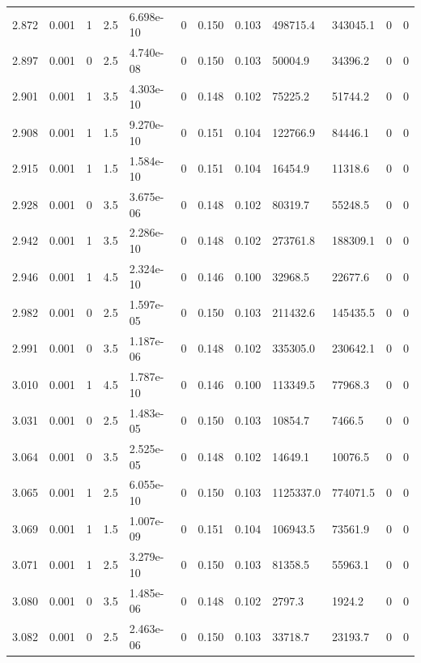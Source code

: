 \documentclass[preview]{standalone}
\begin{document}
{{{{{{{\begin{tabular}{L{1.2cm}C{1.2cm} C{0.3cm}C{0.5cm} C{1.4cm}C{1.4cm} C{1.4cm}C{1.4cm} C{1.6cm}C{1.6cm} C{1.6cm}C{1.6cm}}
  2.872  &  0.001  & 1     & 2.5 &  6.698e-10  & 0  &  0.150&   0.103& 498715.4 & 343045.1   &  0 & 0  \\ 
  2.897  &  0.001  & 0     & 2.5 &  4.740e-08  & 0  &  0.150&   0.103& 50004.9 & 34396.2   &  0 & 0  \\ 
  2.901  &  0.001  & 1     & 3.5 &  4.303e-10  & 0  &  0.148&   0.102& 75225.2 & 51744.2   &  0 & 0  \\ 
  2.908  &  0.001  & 1     & 1.5 &  9.270e-10  & 0  &  0.151&   0.104& 122766.9 & 84446.1   &  0 & 0  \\ 
  2.915  &  0.001  & 1     & 1.5 &  1.584e-10  & 0  &  0.151&   0.104& 16454.9 & 11318.6   &  0 & 0  \\ 
  2.928  &  0.001  & 0     & 3.5 &  3.675e-06  & 0  &  0.148&   0.102& 80319.7 & 55248.5   &  0 & 0  \\ 
  2.942  &  0.001  & 1     & 3.5 &  2.286e-10  & 0  &  0.148&   0.102& 273761.8 & 188309.1   &  0 & 0  \\ 
  2.946  &  0.001  & 1     & 4.5 &  2.324e-10  & 0  &  0.146&   0.100& 32968.5 & 22677.6   &  0 & 0  \\ 
  2.982  &  0.001  & 0     & 2.5 &  1.597e-05  & 0  &  0.150&   0.103& 211432.6 & 145435.5   &  0 & 0  \\ 
  2.991  &  0.001  & 0     & 3.5 &  1.187e-06  & 0  &  0.148&   0.102& 335305.0 & 230642.1   &  0 & 0  \\ 
  3.010  &  0.001  & 1     & 4.5 &  1.787e-10  & 0  &  0.146&   0.100& 113349.5 & 77968.3   &  0 & 0  \\ 
  3.031  &  0.001  & 0     & 2.5 &  1.483e-05  & 0  &  0.150&   0.103& 10854.7 & 7466.5   &  0 & 0  \\ 
  3.064  &  0.001  & 0     & 3.5 &  2.525e-05  & 0  &  0.148&   0.102& 14649.1 & 10076.5   &  0 & 0  \\ 
  3.065  &  0.001  & 1     & 2.5 &  6.055e-10  & 0  &  0.150&   0.103& 1125337.0 & 774071.5   &  0 & 0  \\ 
  3.069  &  0.001  & 1     & 1.5 &  1.007e-09  & 0  &  0.151&   0.104& 106943.5 & 73561.9   &  0 & 0  \\ 
  3.071  &  0.001  & 1     & 2.5 &  3.279e-10  & 0  &  0.150&   0.103& 81358.5 & 55963.1   &  0 & 0  \\ 
  3.080  &  0.001  & 0     & 3.5 &  1.485e-06  & 0  &  0.148&   0.102& 2797.3 & 1924.2   &  0 & 0  \\ 
  3.082  &  0.001  & 0     & 2.5 &  2.463e-06  & 0  &  0.150&   0.103& 33718.7 & 23193.7   &  0 & 0  \\ 

\end{tabular}}}}}}}}
\end{document}
